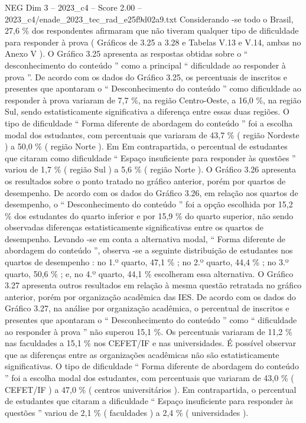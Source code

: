 \begin{textsample}{NEG Dim 3 – 2023\_c4 – Score 2.00 – 2023\_c4/enade\_2023\_tec\_rad\_e25f9d02a9.txt}
Considerando -se todo o Brasil, 27,6 \% dos respondentes afirmaram que não tiveram qualquer tipo de dificuldade para responder à prova ( Gráficos de 3.25 a 3.28 e Tabelas V.13 e V.14, ambas no Anexo V ).
O Gráfico 3.25 apresenta as respostas obtidas sobre o “ desconhecimento do conteúdo ” como a principal “ dificuldade ao responder à prova ”.
De acordo com os dados do Gráfico 3.25, os percentuais de inscritos e presentes que apontaram o “ Desconhecimento do conteúdo ” como dificuldade ao responder à prova variaram de 7,7 \%, na região Centro-Oeste, a 16,0 \%, na região Sul, sendo estatisticamente significativa a diferença entre essas duas regiões.
O tipo de dificuldade “ Forma diferente de abordagem do conteúdo ” foi a escolha modal dos estudantes, com percentuais que variaram de 43,7 \% ( região Nordeste ) a 50,0 \% ( região Norte ).
Em Em contrapartida, o percentual de estudantes que citaram como dificuldade “ Espaço insuficiente para responder às questões ” variou de 1,7 \% ( região Sul ) a 5,6 \% ( região Norte ).
O Gráfico 3.26 apresenta os resultados sobre o ponto tratado no gráfico anterior, porém por quartos de desempenho.
De acordo com os dados do Gráfico 3.26, em relação aos quartos de desempenho, o “ Desconhecimento do conteúdo ” foi a opção escolhida por 15,2 \% dos estudantes do quarto inferior e por 15,9 \% do quarto superior, não sendo observadas diferenças estatisticamente significativas entre os quartos de desempenho.
Levando -se em conta a alternativa modal, “ Forma diferente de abordagem do conteúdo ”, observa -se a seguinte distribuição de estudantes nos quartos de desempenho : no 1.º quarto, 47,1 \% ; no 2.º quarto, 44,4 \% ; no 3.º quarto, 50,6 \% ; e, no 4.º quarto, 44,1 \% escolheram essa alternativa.
O Gráfico 3.27 apresenta outros resultados em relação à mesma questão retratada no gráfico anterior, porém por organização acadêmica das IES.
De acordo com os dados do Gráfico 3.27, na análise por organização acadêmica, o percentual de inscritos e presentes que apontaram o “ Desconhecimento do conteúdo ” como “ dificuldade ao responder à prova ” não superou 15,1 \%.
Os percentuais variaram de 11,2 \% nas faculdades a 15,1 \% nos CEFET/IF e nas universidades.
É possível observar que as diferenças entre as organizações acadêmicas não são estatisticamente significativas.
O tipo de dificuldade “ Forma diferente de abordagem do conteúdo ” foi a escolha modal dos estudantes, com percentuais que variaram de 43,0 \% ( CEFET/IF ) a 47,0 \% ( centros universitários ).
Em contrapartida, o percentual de estudantes que citaram a dificuldade “ Espaço insuficiente para responder às questões ” variou de 2,1 \% ( faculdades ) a 2,4 \% ( universidades ).

\end{textsample}
